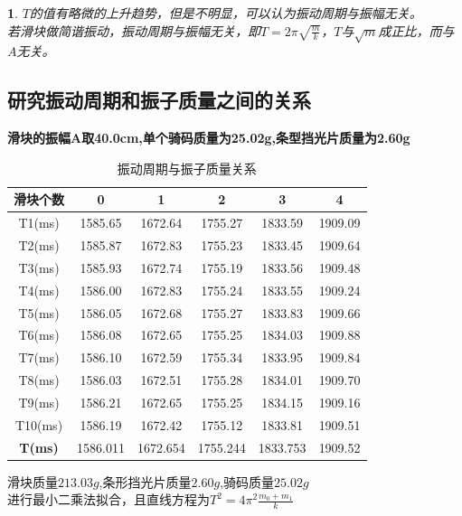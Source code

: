 \documentclass[UTF8]{article}
\theoremstyle{MyLineTheoremStyle} %
\theoremstyle{MyBlockTheoremStyle} %
\theoremstyle{MySubsubsectionStyle} %
\newtheorem{definition}{}
\begin{document}
\begin{definition}
$T$的值有略微的上升趋势，但是不明显，可以认为振动周期与振幅无关。\\
\indent 若滑块做简谐振动，振动周期与振幅无关，即$T=2\pi\sqrt{\frac{m}{k}}$，$T$与$\sqrt{m}$成正比，而与$A$无关。\\
\end{definition}



\cleardoublepage
\subsection{研究振动周期和振子质量之间的关系}
\textbf{滑块的振幅A取40.0cm,单个骑码质量为25.02g,条型挡光片质量为2.60g}
\begin{table}[H]
    \centering
    \begin{tabular}{|c|c|c|c|c|c|}
        \hline
        滑块个数 & 0 & 1 & 2 & 3 & 4\\
        \hline
        T1(ms) & 1585.65 & 1672.64 & 1755.27 & 1833.59 & 1909.09\\
        \hline
        T2(ms) & 1585.87 & 1672.83 & 1755.23 & 1833.45 & 1909.64\\
        \hline
        T3(ms) & 1585.93 & 1672.74 & 1755.19 & 1833.56 & 1909.48\\
        \hline
        T4(ms) & 1586.00 & 1672.83 & 1755.24 & 1833.55 & 1909.24\\
        \hline
        T5(ms) & 1586.05 & 1672.68 & 1755.27 & 1833.83 & 1909.66\\
        \hline
        T6(ms) & 1586.08 & 1672.65 & 1755.25 & 1834.03 & 1909.88\\
        \hline
        T7(ms) & 1586.10 & 1672.59 & 1755.34 & 1833.95 & 1909.84\\
        \hline
        T8(ms) & 1586.03 & 1672.51 & 1755.28 & 1834.01 & 1909.70\\
        \hline
        T9(ms) & 1586.21 & 1672.65 & 1755.25 & 1834.15 & 1909.16\\
        \hline
        T10(ms) & 1586.19 & 1672.42 & 1755.12 & 1833.81 & 1909.51\\
        \hline
        \textbf{T(ms)} & 1586.011 & 1672.654 & 1755.244 & 1833.753 & 1909.52\\
        \hline			
    \end{tabular}
    \caption{\small 振动周期与振子质量关系}
\end{table}

滑块质量$213.03g$,条形挡光片质量$2.60g$,骑码质量$25.02g$\\
\indent 进行最小二乘法拟合，且直线方程为$T^{2}=4\pi^{2}\frac{m_{0}+m_{1}}{k}$\\
\end{document}
